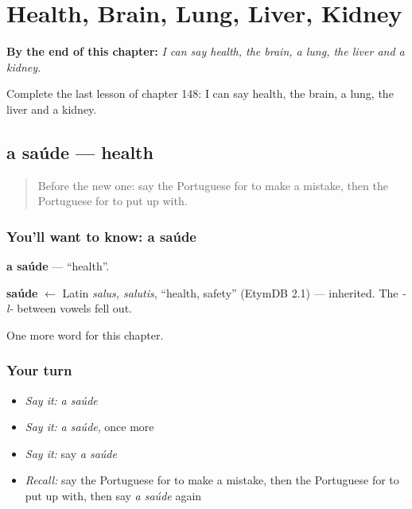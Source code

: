 
\chapter{Health, Brain, Lung, Liver, Kidney}
\label{ch:pt-health-brain-lung-liver-kidney}

\begin{chapteropening}
\textbf{By the end of this chapter:} \emph{I can say health, the brain, a lung, the liver and a kidney.}

Complete the last lesson of chapter 148: I can say health, the brain, a lung, the liver and a kidney.
\end{chapteropening}

\section[a saúde]{a saúde — health}

\label{lesson:PT-C148-saude}



\begin{quote}
Before the new one: say the Portuguese for to make a mistake, then the Portuguese for to put up with.
\end{quote}

\subsection*{You'll want to know: a saúde}
\textbf{a saúde} — \textquotedblleft{}health\textquotedblright{}.

\begin{cousinweb}
\textbf{saúde} $\leftarrow$ Latin \emph{salus, salutis}, \textquotedblleft{}health, safety\textquotedblright{} (EtymDB 2.1) — inherited. The \emph{-l-} between vowels fell out.
\end{cousinweb}

\begin{grammarlens}[title={What you've built}]
One more word for this chapter.
\end{grammarlens}

\subsection*{Your turn}
\begin{itemize}
\raggedright
  \item \emph{Say it:} \emph{a saúde}
  \item \emph{Say it:} \emph{a saúde}, once more
  \item \emph{Say it:} say \emph{a saúde}
  \item \emph{Recall:} say the Portuguese for to make a mistake, then the Portuguese for to put up with, then say \emph{a saúde} again
\end{itemize}

